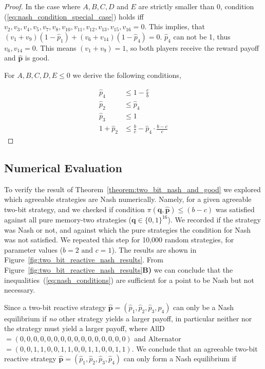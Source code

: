 \documentclass{article}
\theoremstyle{definition}
\begin{document}
\begin{proof}
    In the case where \(A, B, C, D\) and \(E\) are strictly smaller than 0, condition
    (\ref{eq:nash_condition_special_case}) holds iff \(v_2, v_3,
    v_4, v_5, v_7, v_8, v_{10},
    v_{11}, \allowbreak v_{12}, v_{13}, v_{15}, v_{16} =
    0\). This implies, that \((v_1 + v_9) (1 - \hat{p}_1) + (v_6 +
    v_{14}) (1 - \hat{p}_4) = 0\). \(\hat{p}_4\) can not be 1, thus \(v_6,
    v_{14} = 0\). This means \((v_1 + v_9) = 1\), so both
    players receive the reward payoff and \(\mathbf{\hat{p}}\) is good.
    
    For \(A, B, C, D, E \leq 0\) we derive the following conditions,
    
    \begin{align}\label{eq:nash_conditions}
    \hat{p}_4       & \leq 1 - \frac{c}{b} \\
    \hat{p}_2       & \leq \hat{p}_4 \\
    \hat{p}_3       & \leq 1 \\
    1 + \hat{p}_2 & \leq \frac{b}{c} - \hat{p}_4 \cdot \frac{b\!-\!c}{c}
    \end{align}
\end{proof}

\subsection{Numerical Evaluation}

To verify the result of Theorem~\ref{theorem:two_bit_nash_and_good} we explored
which agreeable strategies are Nash numerically. Namely, for a given agreeable
two-bit strategy, and we checked if condition \(\pi({\mathbf{q}},
\mathbf{\hat{p}}) \leq (b\!-\!c)\) was satisfied against all pure memory-two
strategies (\(\mathbf{q} \in \{0, 1\}^{16}\)). We recorded if the strategy was
Nash or not, and against which the pure strategies the condition for Nash was
not satisfied. We repeated this step for 10,000 random strategies, for parameter
values (\(b=2 \text{ and } c=1\)). The results are shown in
Figure~\ref{fig:two_bit_reactive_nash_results}. From
Figure~\ref{fig:two_bit_reactive_nash_results}\textbf{B)} we can conclude that
the inequalities~(\ref{eq:nash_conditions}) are sufficient for a point to be
Nash but not necessary.

Since a two-bit reactive strategy \(\mathbf{\hat{p}} = (\hat{p}_{1},
\hat{p}_{2}, \hat{p}_{3}, \hat{p}_{4})\) can only be a Nash equilibrium if {\it no} other strategy yields a larger payoff,  in particular neither  nor the  strategy must yield a larger payoff, where
AllD\(=(0, 0, 0, 0, 0, 0, 0, 0, 0, 0, 0, 0, 0, 0, 0, 0)\) and
Alternator\(=(0, 0, 1, 1, 0, 0, 1, 1, 0, 0, 1, 1, 0, 0, 1, 1)\). 
We conclude that an agreeable two-bit reactive strategy  \(\mathbf{\hat{p}} = (\hat{p}_{1}, \hat{p}_{2}, \hat{p}_{3}, \hat{p}_{4})\) can only form a Nash equilibrium if 
\end{document}

